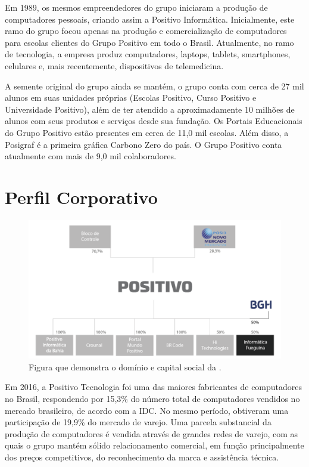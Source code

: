 Em 1989, os mesmos empreendedores do grupo iniciaram a produção de computadores pessoais, criando assim a Positivo Informática. Inicialmente, este ramo do grupo focou apenas na produção e comercialização de computadores para escolas clientes do Grupo Positivo em todo o Brasil. Atualmente, no ramo de tecnologia, a empresa produz computadores, laptops, tablets, smartphones, celulares e, mais recentemente, dispositivos de telemedicina. 

A semente original do grupo ainda se mantém, o grupo conta com cerca de 27 mil alunos em suas unidades próprias (Escolas Positivo, Curso Positivo e Universidade Positivo), além de ter atendido a aproximadamente 10 milhões de alunos com seus produtos e serviços desde sua fundação. Os Portais Educacionais do Grupo Positivo estão presentes em cerca de 11,0 mil escolas. Além disso, a Posigraf é a primeira gráfica Carbono Zero do país. O Grupo Positivo conta atualmente com mais de 9,0 mil colaboradores.

\section{Perfil Corporativo}

\begin{figure}[h]
\begin{centering}
\includegraphics[width=1.0\textwidth]{Img/Corporativo}
\caption{Figura que demonstra o domínio e capital social da \nomeCompletoPositivo{}.}
\par\end{centering}
\end{figure}

Em 2016, a Positivo Tecnologia foi uma das maiores fabricantes de computadores no Brasil, respondendo por 15,3\% do número total de computadores vendidos no mercado brasileiro, de acordo com a IDC. No mesmo período, obtiveram uma participação de 19,9\% do mercado de varejo. Uma parcela substancial da produção de computadores é vendida através de grandes redes de varejo, com as quais o grupo mantém sólido relacionamento comercial, em função principalmente dos preços competitivos, do reconhecimento da marca e assistência técnica.

